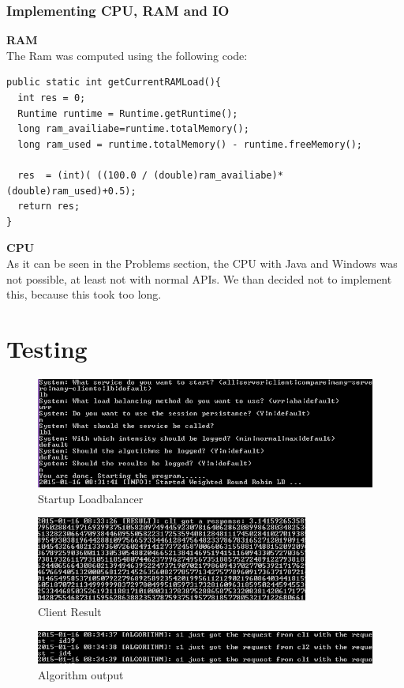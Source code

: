\documentclass[12pt]{article}
\begin{document}
\subsubsection{Implementing CPU, RAM and IO} 
\textbf{RAM}\\
The Ram was computed using the following code:
\begin{lstlisting}
public static int getCurrentRAMLoad(){
  int res = 0;
  Runtime runtime = Runtime.getRuntime();
  long ram_availiabe=runtime.totalMemory();
  long ram_used = runtime.totalMemory() - runtime.freeMemory();
		
  res  = (int)( ((100.0 / (double)ram_availiabe)*(double)ram_used)+0.5);
  return res;
}	
\end{lstlisting}
\textbf{CPU}\\
As it can be seen in the Problems section, the CPU with Java and Windows was not possible, at least not with normal APIs. We than decided not to implement this, because this took too long.
\section{Testing}
\begin{figure}[here!]
\centering
    \includegraphics[width=1.0\textwidth]{images/lb1}
    \caption{Startup Loadbalancer}
    \label{fig:2}
\end{figure}
\begin{figure}[here!]
\centering
    \includegraphics[width=0.8\textwidth]{images/lb2}
    \caption{Client Result}
    \label{fig:2}
\end{figure}
\begin{figure}[here!]
\centering
    \includegraphics[width=1.0\textwidth]{images/lb3}
    \caption{Algorithm output}
    \label{fig:2}
\end{figure}
\end{document}
